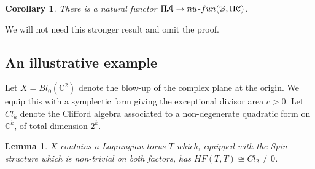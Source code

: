 \documentclass[reqno,10pt]{amsart}
\numberwithin{equation}{section}
\newcommand{\bC}{{\mathbb C}}
\newcommand{\scrC}{\EuScript{C}}
\newcommand{\scrA}{\EuScript{A}}
\newcommand{\scrB}{\EuScript{B}}
\newtheorem{Corollary}[thm]{Corollary}
\newtheorem{Lemma}[thm]{Lemma}
\theoremstyle{remark}
\begin{document}
\begin{Corollary}
There is a natural functor $\Pi\scrA \rightarrow nu$-$fun(\scrB,\Pi\scrC)$.
\end{Corollary}

We will not  need this stronger result and omit the proof.

\subsection{An illustrative example}\label{Section:BlowupC2}

Let $X = Bl_{0}(\bC^2)$ denote the blow-up of the complex plane at the origin.  We equip this with a symplectic form giving the exceptional divisor area $c> 0$. Let $Cl_k$ denote the Clifford algebra associated to a non-degenerate quadratic form on $\bC^k$, of total dimension $2^k$.

\begin{Lemma} \label{Lem:ToricFibre}
$X$ contains a Lagrangian torus $T$ which, equipped with the \emph{Spin} structure which is non-trivial on both factors, has $HF(T,T) \cong Cl_2 \neq 0$.
\end{Lemma}
\end{document}

